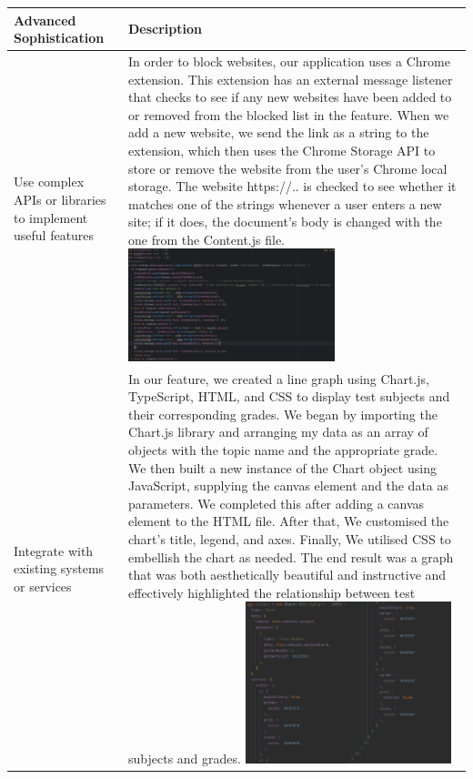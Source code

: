 \documentclass[a4paper]{article}
\begin{document}
\newpage
{\noindent\begin{tabular}{|p{0.25\linewidth}|p{0.75\linewidth}|}
\hline
\textbf{Advanced Sophistication} & \textbf{Description} \\
\hline
Use complex APIs or libraries to implement useful features & In order to block websites, our application uses a Chrome extension. This extension has an external message listener that checks to see if any new websites have been added to or removed from the blocked list in the feature. When we add a new website, we send the link as a string to the extension, which then uses the Chrome Storage API to store or remove the website from the user's Chrome local storage.
The website https://.. is checked to see whether it matches one of the strings whenever a user enters a new site; if it does, the document's body is changed with the one from the Content.js file. \includegraphics[width=6cm]{./image/anti_api.png}\\
\hline
Integrate with existing systems or services & In our feature, we created a line graph using Chart.js, TypeScript, HTML, and CSS to display test subjects and their corresponding grades. We began by importing the Chart.js library and arranging my data as an array of objects with the topic name and the appropriate grade. We then built a new instance of the Chart object using JavaScript, supplying the canvas element and the data as parameters. We completed this after adding a canvas element to the HTML file. After that, We customised the chart's title, legend, and axes. Finally, We utilised CSS to embellish the chart as needed. The end result was a graph that was both aesthetically beautiful and instructive and effectively highlighted the relationship between test subjects and grades. \includegraphics[width=6cm]{./image/chart_proof.png}\\
\hline
\end{tabular}}
\end{document}
